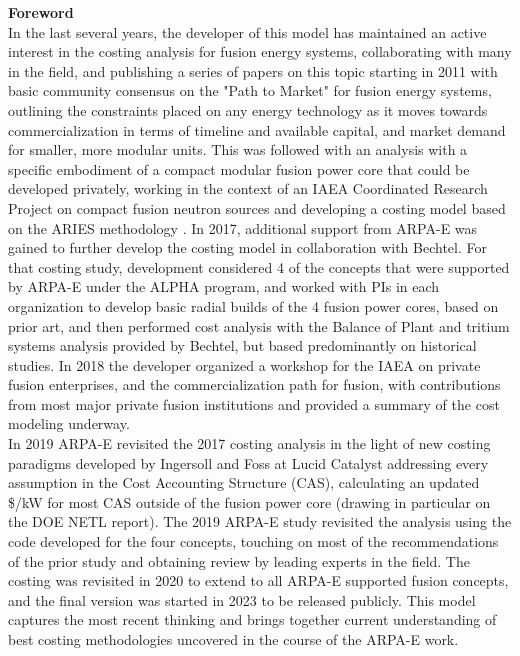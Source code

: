 \textbf{Foreword} \\

In the last several years, the developer of this model has maintained an active interest in the costing analysis for fusion energy systems, collaborating with many in the field, and publishing a series of papers on this topic starting in 2011 with basic community consensus on the "Path to Market" for fusion energy systems, outlining the constraints placed on any energy technology as it moves towards commercialization in terms of timeline and available capital, and market demand for smaller, more modular units. This was followed with an analysis with a specific embodiment of a compact modular fusion power core that could be developed privately, working in the context of an IAEA Coordinated Research Project on compact fusion neutron sources and developing a costing model based on the ARIES methodology \cite{waganer2006design}. In 2017, additional support from ARPA-E was gained to further develop the costing model in collaboration with Bechtel. For that costing study, development considered 4 of the concepts that were supported by ARPA-E under the ALPHA program, and worked with PIs in each organization to develop basic radial builds of the 4 fusion power cores, based on prior art, and then performed cost analysis with the Balance of Plant and tritium systems analysis provided by Bechtel, but based predominantly on historical studies. In 2018 the developer organized a workshop for the IAEA on private fusion enterprises, and the commercialization path for fusion, with contributions from most major private fusion institutions and provided a summary of the cost modeling underway.\\

In 2019 ARPA-E revisited the 2017 costing analysis in the light of new costing paradigms developed by Ingersoll and Foss at Lucid Catalyst addressing every assumption in the Cost Accounting Structure (CAS), calculating an updated \$/kW for most CAS outside of the fusion power core (drawing in particular on the DOE NETL report). The 2019 ARPA-E study revisited the analysis using the code developed for the four concepts, touching on most of the recommendations of the prior study and obtaining review by leading experts in the field. The costing was revisited in 2020 to extend to all ARPA-E supported fusion concepts, and the final version was started in 2023 to be released publicly. This model captures the most recent thinking and brings together current understanding of best costing methodologies uncovered in the course of the ARPA-E work.\\

